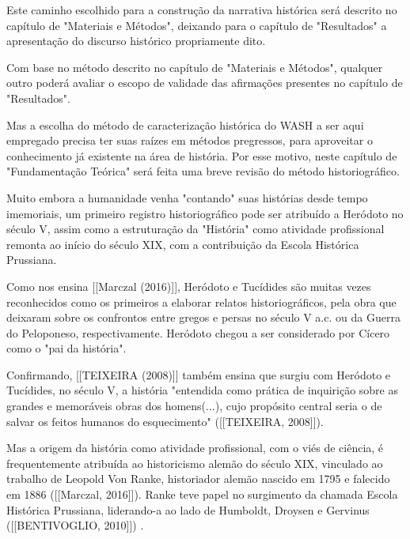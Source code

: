Este caminho escolhido para a construção da narrativa histórica será descrito no capítulo de "Materiais e Métodos", deixando para o capítulo de "Resultados" a apresentação do discurso histórico propriamente dito.

Com base no método descrito no capítulo de "Materiais e Métodos", qualquer outro poderá avaliar o escopo de validade das afirmações presentes no capítulo de "Resultados".

Mas a escolha do método de caracterização histórica do WASH a ser aqui empregado precisa ter suas raízes em métodos pregressos, para aproveitar o conhecimento já existente na área de história. Por esse motivo, neste capítulo de "Fundamentação Teórica" será feita uma breve revisão do método historiográfico.

Muito embora a humanidade venha "contando" suas histórias desde tempo imemoriais, um primeiro registro historiográfico pode ser atribuído a Heródoto no século V, assim como a estruturação da "História" como atividade profissional remonta ao início do século XIX, com a contribuição da Escola Histórica Prussiana.

Como nos ensina  [[Marczal (2016)]],  Heródoto e Tucídides são muitas vezes reconhecidos como os primeiros a elaborar relatos historiográficos, pela obra que deixaram sobre os confrontos entre gregos e persas no século V a.c. ou da Guerra do Peloponeso, respectivamente. Heródoto chegou a ser considerado por Cícero como o "pai da história".

Confirmando, [[TEIXEIRA (2008)]]  também ensina que surgiu com Heródoto e Tucídides, no século V, a história "entendida como prática de inquirição sobre as grandes e memoráveis obras dos homens(...), cujo propósito central seria o de salvar os feitos humanos do esquecimento"  ([[TEIXEIRA, 2008]]).

Mas a origem da história como atividade profissional, com o viés de ciência, é frequentemente atribuída ao historicismo alemão do século XIX, vinculado ao trabalho de Leopold Von Ranke, historiador alemão nascido em 1795 e falecido em 1886 ([[Marczal, 2016]]). Ranke teve papel no surgimento da chamada Escola Histórica Prussiana, liderando-a ao lado de Humboldt, Droysen e Gervinus  ([[BENTIVOGLIO, 2010]]) .



